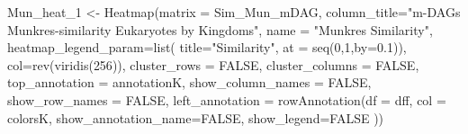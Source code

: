 \documentclass[
  letterpaper,
  DIV=11,
  numbers=noendperiod]{scrreprt}
\newenvironment{Shaded}{}{}
\newcommand{\AttributeTok}[1]{\textcolor[rgb]{0.78,0.47,0.87}{#1}}
\newcommand{\ConstantTok}[1]{\textcolor[rgb]{0.82,0.60,0.40}{#1}}
\newcommand{\DecValTok}[1]{\textcolor[rgb]{0.82,0.60,0.40}{#1}}
\newcommand{\DocumentationTok}[1]{\textcolor[rgb]{0.64,0.20,0.25}{#1}}
\newcommand{\FloatTok}[1]{\textcolor[rgb]{0.82,0.60,0.40}{#1}}
\newcommand{\FunctionTok}[1]{\textcolor[rgb]{0.38,0.69,0.94}{#1}}
\newcommand{\NormalTok}[1]{\textcolor[rgb]{0.67,0.70,0.75}{#1}}
\newcommand{\OtherTok}[1]{\textcolor[rgb]{0.15,0.68,0.38}{#1}}
\newcommand{\SpecialCharTok}[1]{\textcolor[rgb]{0.34,0.71,0.76}{#1}}
\newcommand{\StringTok}[1]{\textcolor[rgb]{0.60,0.76,0.47}{#1}}
\begin{document}
\begin{Shaded}
\begin{Highlighting}[]
\NormalTok{Mun\_heat\_1 }\OtherTok{\textless{}{-}} \FunctionTok{Heatmap}\NormalTok{(}\AttributeTok{matrix =}\NormalTok{ Sim\_Mun\_mDAG, }
             \AttributeTok{column\_title=}\StringTok{"m{-}DAGs Munkres{-}similarity  Eukaryotes by Kingdoms"}\NormalTok{,}
            \AttributeTok{name =} \StringTok{"Munkres Similarity"}\NormalTok{,}
            \AttributeTok{heatmap\_legend\_param=}\FunctionTok{list}\NormalTok{(}
                        \AttributeTok{title=}\StringTok{"Similarity"}\NormalTok{,}
                        \AttributeTok{at =} \FunctionTok{seq}\NormalTok{(}\DecValTok{0}\NormalTok{,}\DecValTok{1}\NormalTok{,}\AttributeTok{by=}\FloatTok{0.1}\NormalTok{)),}
                      \AttributeTok{col=}\FunctionTok{rev}\NormalTok{(}\FunctionTok{viridis}\NormalTok{(}\DecValTok{256}\NormalTok{)),}
                      \AttributeTok{cluster\_rows =} \ConstantTok{FALSE}\NormalTok{,}
                      \AttributeTok{cluster\_columns =} \ConstantTok{FALSE}\NormalTok{,}
                      \AttributeTok{top\_annotation =}\NormalTok{ annotationK,}
                      \AttributeTok{show\_column\_names =} \ConstantTok{FALSE}\NormalTok{, }
                      \AttributeTok{show\_row\_names =} \ConstantTok{FALSE}\NormalTok{,}
                      \AttributeTok{left\_annotation =}
                        \FunctionTok{rowAnnotation}\NormalTok{(}\AttributeTok{df =}\NormalTok{ dff,}
                                      \AttributeTok{col =}\NormalTok{ colorsK,}
                                    \AttributeTok{show\_annotation\_name=}\ConstantTok{FALSE}\NormalTok{,}
                                    \AttributeTok{show\_legend=}\ConstantTok{FALSE}\NormalTok{                                                                        ))}
\end{Highlighting}
\end{Shaded}

\begin{Shaded}
\end{Shaded}
\end{document}
